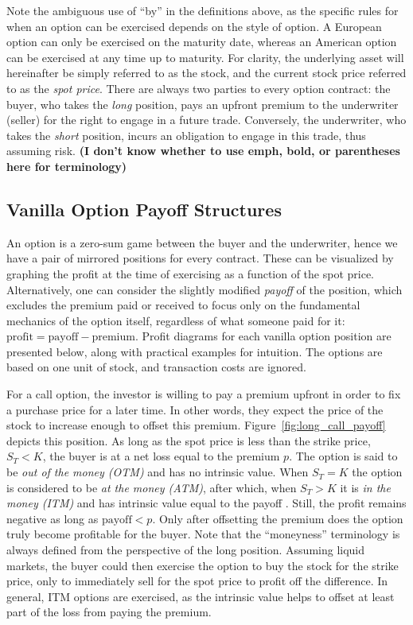 \documentclass[english,12pt,a4paper,pdftex,sci,utf8]{aaltothesis}
\begin{document}
Note the ambiguous use of ``by'' in the definitions above, as the specific rules for when an option can be exercised depends on the style of option. A European option can only be exercised on the maturity date, whereas an American option can be exercised at any time up to maturity. For clarity, the underlying asset will hereinafter be simply referred to as the stock, and the current stock price referred to as the \emph{spot price}. There are always two parties to every option contract: the buyer, who takes the \emph{long} position, pays an upfront premium to the underwriter (seller) for the right to engage in a future trade. Conversely, the underwriter, who takes the \emph{short} position, incurs an obligation to engage in this trade, thus assuming risk. \textbf{(I don't know whether to use emph, bold, or parentheses here for terminology)}

\subsection{Vanilla Option Payoff Structures}\label{payoffs}

An option is a zero-sum game between the buyer and the underwriter, hence we have a pair of mirrored positions for every contract. These can be visualized by graphing the profit at the time of exercising as a function of the spot price. Alternatively, one can consider the slightly modified \emph{payoff} of the position, which excludes the premium paid or received to focus only on the fundamental mechanics of the option itself, regardless of what someone paid for it: $\text{profit} = \text{payoff} - \text{premium}$. Profit diagrams for each vanilla option position are presented below, along with practical examples for intuition. The options are based on one unit of stock, and transaction costs are ignored.

For a call option, the investor is willing to pay a premium upfront in order to fix a purchase price for a later time. In other words, they expect the price of the stock to increase enough to offset this premium. Figure~\ref{fig:long_call_payoff} depicts this position. As long as the spot price is less than the strike price, $S_T < K$, the buyer is at a net loss equal to the premium $p$. The option is said to be \emph{out of the money (OTM)} and has no intrinsic value. When $S_T = K$ the option is considered to be \emph{at the money (ATM)}, after which, when $S_T > K$ it is \emph{in the money (ITM)} and has intrinsic value equal to the payoff \cite{hull2013fundamentals}. Still, the profit remains negative as long as $\text{payoff} < p$. Only  after offsetting the premium does the option truly become profitable for the buyer. Note that the ``moneyness'' terminology is always defined from the perspective of the long position. Assuming liquid markets, the buyer could then exercise the option to buy the stock for the strike price, only to immediately sell for the spot price to profit off the difference. In general, ITM options are exercised, as the intrinsic value helps to offset at least part of the loss from paying the premium.
\end{document}
